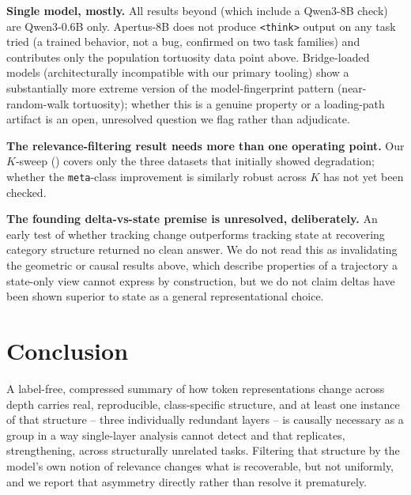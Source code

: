 \documentclass{article}
\theoremstyle{plain}
\theoremstyle{definition}
\theoremstyle{remark}
\begin{document}
\textbf{Single model, mostly.} All results beyond  (which include a Qwen3-8B check) are Qwen3-0.6B only.
Apertus-8B does not produce \texttt{<think>} output on any task tried (a trained
behavior, not a bug, confirmed on two task families) and contributes only the population
tortuosity data point above. Bridge-loaded models (architecturally incompatible with our
primary tooling) show a substantially more extreme version of the model-fingerprint
pattern (near-random-walk tortuosity); whether this is a genuine property or a
loading-path artifact is an open, unresolved question we flag rather than adjudicate.

\textbf{The relevance-filtering result needs more than one operating point.} Our
$K$-sweep () covers only the three datasets that initially showed
degradation; whether the \texttt{meta}-class improvement is similarly robust across $K$
has not yet been checked.

\textbf{The founding delta-vs-state premise is unresolved, deliberately.} An early test
of whether tracking change outperforms tracking state at recovering category structure
returned no clean answer. We do not read this as invalidating the geometric or causal
results above, which describe properties of a trajectory a state-only view cannot
express by construction, but we do not claim deltas have been shown superior to state as
a general representational choice.

\section{Conclusion}
\label{sec:conclusion}

A label-free, compressed summary of how token representations change across depth
carries real, reproducible, class-specific structure, and at least one instance of that
structure -- three individually redundant layers -- is causally necessary as a group in
a way single-layer analysis cannot detect and that replicates, strengthening, across
structurally unrelated tasks. Filtering that structure by the model's own notion of
relevance changes what is recoverable, but not uniformly, and we report that asymmetry
directly rather than resolve it prematurely.



\end{document}
